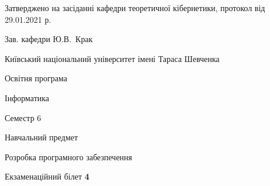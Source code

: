 \documentclass[10pt, ukrainian]{article}
\begin{document}
{\vspace{5mm}\smallskip \begin {small} Затверджено на засіданні кафедри теоретичної кібернетики, протокол  від   29.01.2021 р.\par\smallskip\smallskip
{\parbox {6.5 cm}{Зав. кафедри \dotfill Ю.В.~Крак}} \end{small}}
\newpage

{{\begin {small}\par
{ \center  Київський національний університет імені Тараса Шевченка \par}
{\parbox {5 cm}{Освітня програма \hfill}{\parbox {7 cm}{Інформатика \hfill}}\parbox {6 cm}{\hfill Семестр 6}}\par
{\parbox {5 cm} {Навчальний предмет \hfill}\parbox {7 cm}{Розробка програмного забезпечення \hfill}\parbox {6cm}{\hfill}\par}\vspace{-7pt} \end{small}}{\center Екзаменаційний білет \No \textbf
{ 4 }\par}}
\end{document}
